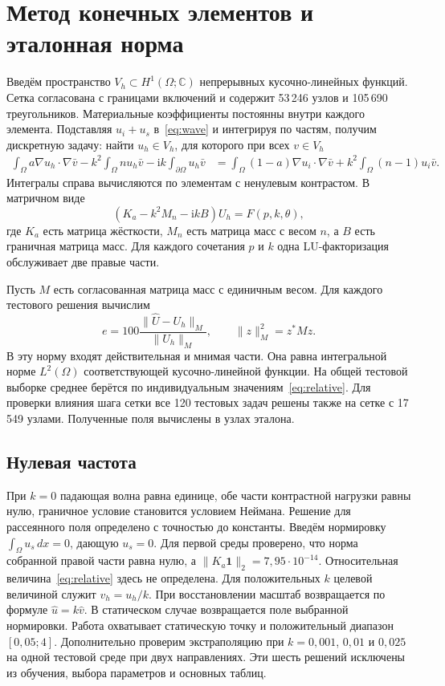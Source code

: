 \documentclass[11pt,a4paper]{article}
\newcommand{\ii}{\mathrm{i}}
\newcommand{\C}{\mathbb C}
\newcommand{\norm}[1]{\lVert #1\rVert}
\begin{document}
\clearpage
\section{Метод конечных элементов и эталонная норма}
Введём пространство $V_h\subset H^1(\Omega;\C)$ непрерывных кусочно-линейных функций. Сетка согласована с границами включений и содержит 53\,246 узлов и 105\,690 треугольников. Материальные коэффициенты постоянны внутри каждого элемента. Подставляя $u_i+u_s$ в~\eqref{eq:wave} и интегрируя по частям, получим дискретную задачу: найти $u_h\in V_h$, для которого при всех $v\in V_h$
\begin{align}
 \int_\Omega a\nabla u_h\cdot\nabla\bar v
 - k^2\int_\Omega n u_h\bar v-\ii k\int_{\partial\Omega}u_h\bar v
 &=\int_\Omega(1-a)\nabla u_i\cdot\nabla\bar v
 +k^2\int_\Omega(n-1)u_i\bar v .
 \label{eq:weak}
\end{align}
Интегралы справа вычисляются по элементам с ненулевым контрастом. В матричном виде
\[
 (K_a-k^2M_n-\ii kB)U_h=F(p,k,\theta),
\]
где $K_a$ есть матрица жёсткости, $M_n$ есть матрица масс с весом $n$, а $B$ есть граничная матрица масс. Для каждого сочетания $p$ и $k$ одна LU-факторизация обслуживает две правые части.

Пусть $M$ есть согласованная матрица масс с единичным весом. Для каждого тестового решения вычислим
\begin{equation}
 e=100\frac{\norm{\widehat U-U_h}_M}{\norm{U_h}_M},\qquad
 \norm{z}_M^2=z^*Mz.
 \label{eq:relative}
\end{equation}
В эту норму входят действительная и мнимая части. Она равна интегральной норме $L^2(\Omega)$ соответствующей кусочно-линейной функции. На общей тестовой выборке среднее берётся по индивидуальным значениям~\eqref{eq:relative}. Для проверки влияния шага сетки все 120 тестовых задач решены также на сетке с 17\,549 узлами. Полученные поля вычислены в узлах эталона. 

\subsection*{Нулевая частота}
При $k=0$ падающая волна равна единице, обе части контрастной нагрузки равны нулю, граничное условие становится условием Неймана. Решение для рассеянного поля определено с точностью до константы. Введём нормировку $\int_\Omega u_s\,dx=0$, дающую $u_s=0$. Для первой среды проверено, что норма собранной правой части равна нулю, а $\norm{K_a\boldsymbol1}_2=7{,}95\cdot10^{-14}$. Относительная величина~\eqref{eq:relative} здесь не определена. Для положительных $k$ целевой величиной служит $v_h=u_h/k$. При восстановлении масштаб возвращается по формуле $\widehat u=k\widehat v$. В статическом случае возвращается поле выбранной нормировки. Работа охватывает статическую точку и положительный диапазон $[0{,}05;4]$. Дополнительно проверим экстраполяцию при $k=0{,}001$, $0{,}01$ и $0{,}025$ на одной тестовой среде при двух направлениях. Эти шесть решений исключены из обучения, выбора параметров и основных таблиц.
\end{document}
